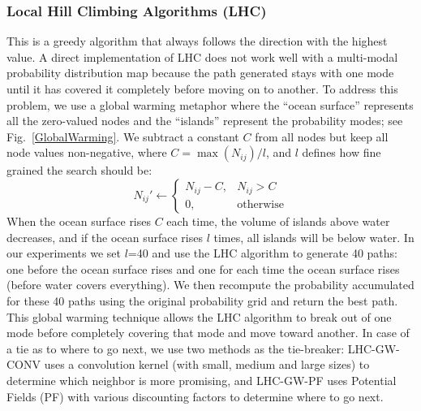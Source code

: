 \documentclass[letterpaper, 10 pt, conference]{ieeeconf}
\begin{document}
%

\subsubsection{Local Hill Climbing Algorithms (LHC)}

This is a greedy algorithm that always follows the direction with the highest value. A direct implementation of LHC does not work well with a multi-modal probability distribution map because the path generated stays with one mode until it has covered it completely before moving on to another. To address this problem, we use a global warming metaphor where the ``ocean surface'' represents all the zero-valued nodes and the ``islands'' represent the probability modes; see Fig.~\ref{GlobalWarming}. We subtract a constant $C$ from all nodes but keep all node values non-negative, where $C \!{=} \max{(N_{ij})}/l$, and $l$ defines how fine grained the search should be:
\begin{equation}
N_{ij}' \leftarrow
	\left\{
	\begin{array}{ll}
		N_{ij} - C, & N_{ij} > C \\
		0, & \mbox{otherwise}
	\end{array}
	\right.
\label{GW}
\end{equation}
When the ocean surface rises $C$ each time, the volume of islands above water decreases, and if the ocean surface rises $l$ times, all islands will be below water. In our experiments we set $l$=40 and use the LHC algorithm to generate 40 paths: one before the ocean surface rises and one for each time the ocean surface rises (before water covers everything). We then recompute the probability accumulated for these 40 paths using the original probability grid and return the best path. This global warming technique allows the LHC algorithm to break out of one mode before completely covering that mode and move toward another. In case of a tie as to where to go next, we use two methods as the tie-breaker: LHC-GW-CONV uses a convolution kernel (with small, medium and large sizes) to determine which neighbor is more promising, and LHC-GW-PF uses Potential Fields (PF) with various discounting factors to determine where to go next.
\end{document}
